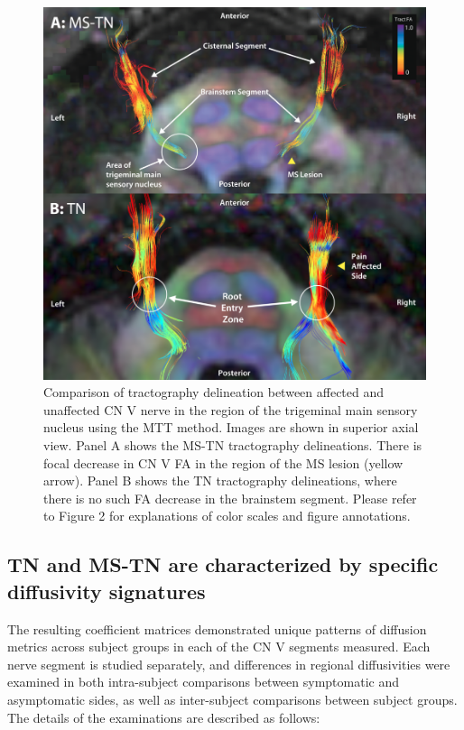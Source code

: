 \begin{figure}[p]
\includegraphics[width=\textwidth]{figure3.png}
\caption{Comparison of tractography delineation between affected and unaffected CN V nerve in the region of the trigeminal main sensory nucleus using the MTT method. Images are shown in superior axial view. Panel A shows the MS-TN tractography delineations. There is focal decrease in CN V FA in the region of the MS lesion (yellow arrow). Panel B shows the TN tractography delineations, where there is no such FA decrease in the brainstem segment. Please refer to Figure 2 for explanations of color scales and figure annotations.}
\centering
\label{fig:MSfigure3}
\end{figure}


\subsection{TN and MS-TN are characterized by specific diffusivity signatures}
The resulting coefficient matrices demonstrated unique patterns of diffusion metrics across subject groups in each of the CN V segments measured. Each nerve segment is studied separately, and differences in regional diffusivities were examined in both intra-subject comparisons between symptomatic and asymptomatic sides, as well as inter-subject comparisons between subject groups. The details of the examinations are described as follows:

